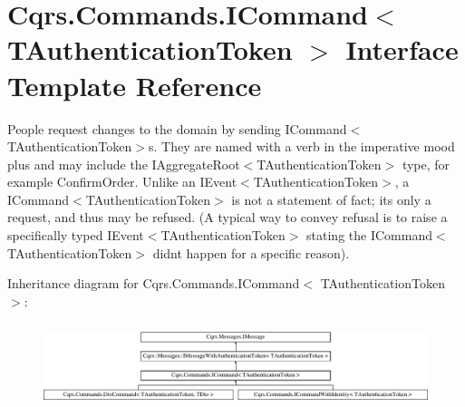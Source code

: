 \hypertarget{interfaceCqrs_1_1Commands_1_1ICommand}{}\section{Cqrs.\+Commands.\+I\+Command$<$ T\+Authentication\+Token $>$ Interface Template Reference}
\label{interfaceCqrs_1_1Commands_1_1ICommand}


People request changes to the domain by sending I\+Command$<$\+T\+Authentication\+Token$>$s. They are named with a verb in the imperative mood plus and may include the I\+Aggregate\+Root$<$\+T\+Authentication\+Token$>$ type, for example Confirm\+Order. Unlike an I\+Event$<$\+T\+Authentication\+Token$>$, a I\+Command$<$\+T\+Authentication\+Token$>$ is not a statement of fact; it\textquotesingle{}s only a request, and thus may be refused. (A typical way to convey refusal is to raise a specifically typed I\+Event$<$\+T\+Authentication\+Token$>$ stating the I\+Command$<$\+T\+Authentication\+Token$>$ didn\textquotesingle{}t happen for a specific reason).  


Inheritance diagram for Cqrs.\+Commands.\+I\+Command$<$ T\+Authentication\+Token $>$\+:\begin{figure}[H]
\begin{center}
\leavevmode
\includegraphics[height=2.477876cm]{interfaceCqrs_1_1Commands_1_1ICommand}
\end{center}
\end{figure}
